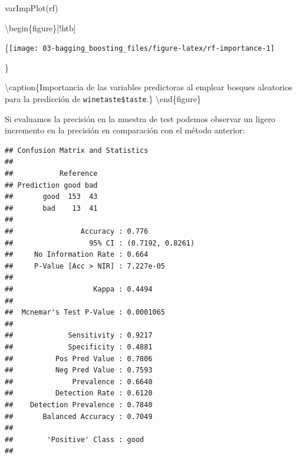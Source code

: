 \documentclass[
  spanish,
]{book}
\newenvironment{Shaded}{\begin{snugshade}}{\end{snugshade}}
\newcommand{\AttributeTok}[1]{\textcolor[rgb]{0.77,0.63,0.00}{#1}}
\newcommand{\FunctionTok}[1]{\textcolor[rgb]{0.00,0.00,0.00}{#1}}
\newcommand{\NormalTok}[1]{#1}
\newcommand{\OtherTok}[1]{\textcolor[rgb]{0.56,0.35,0.01}{#1}}
\newcommand{\SpecialCharTok}[1]{\textcolor[rgb]{0.00,0.00,0.00}{#1}}
\theoremstyle{break}
\theoremstyle{definition}
\theoremstyle{definition}
\theoremstyle{definition}
\theoremstyle{definition}
\theoremstyle{remark}
\begin{document}
\begin{Shaded}
\begin{Highlighting}[]
\FunctionTok{varImpPlot}\NormalTok{(rf)}
\end{Highlighting}
\end{Shaded}

\textbackslash begin\{figure\}{[}!htb{]}

\{\centering \texttt{[image: 03-bagging\_boosting\_files/figure-latex/rf-importance-1]}

\}

\textbackslash caption\{Importancia de las variables predictoras al emplear bosques aleatorios para la predicción de \texttt{winetaste\$taste}.\}\label{fig:rf-importance}
\textbackslash end\{figure\}

Si evaluamos la precisión en la muestra de test podemos observar un ligero incremento en la precisión en comparación con el método anterior:

\begin{Shaded}
\end{Shaded}

\begin{verbatim}
## Confusion Matrix and Statistics
## 
##           Reference
## Prediction good bad
##       good  153  43
##       bad    13  41
##                                           
##                Accuracy : 0.776           
##                  95% CI : (0.7192, 0.8261)
##     No Information Rate : 0.664           
##     P-Value [Acc > NIR] : 7.227e-05       
##                                           
##                   Kappa : 0.4494          
##                                           
##  Mcnemar's Test P-Value : 0.0001065       
##                                           
##             Sensitivity : 0.9217          
##             Specificity : 0.4881          
##          Pos Pred Value : 0.7806          
##          Neg Pred Value : 0.7593          
##              Prevalence : 0.6640          
##          Detection Rate : 0.6120          
##    Detection Prevalence : 0.7840          
##       Balanced Accuracy : 0.7049          
##                                           
##        'Positive' Class : good            
## 
\end{verbatim}
\end{document}
